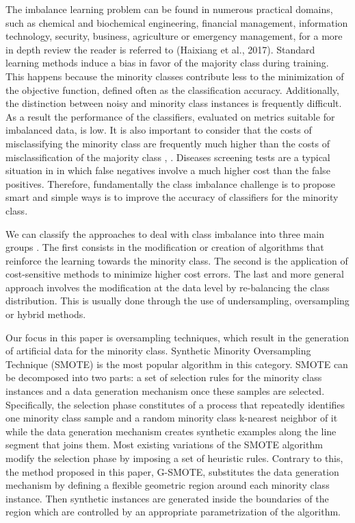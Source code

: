 \documentclass[parskip=full]{scrartcl}
\begin{document}
The imbalance learning problem can be found in numerous practical domains, such
as chemical and biochemical engineering, financial management, information
technology, security, business, agriculture or emergency management, for a more
in depth review the reader is referred to (Haixiang et al., 2017). Standard
learning methods induce a bias in favor of the majority class during training.
This happens because the minority classes contribute less to the minimization of
the objective function, defined often as the classification accuracy.
Additionally, the distinction between noisy and minority class instances is
frequently difficult. As a result the performance of the classifiers, evaluated
on metrics suitable for imbalanced data, is low. It is also important to
consider that the costs of misclassifying the minority class are frequently much
higher than the costs of misclassification of the majority class
\cite{Domingos1999}, \cite{Ting2002}. Diseases screening tests are a typical
situation in in which false negatives involve a much higher cost than the false
positives. Therefore, fundamentally the class imbalance challenge is to propose
smart and simple ways is to improve the accuracy of classifiers for the minority
class.

We can classify the approaches to deal with class imbalance into three main
groups \cite{Fernandez2013}. The first consists in the modification or creation
of algorithms that reinforce the learning towards the minority class. The second
is the application of cost-sensitive methods to minimize higher cost errors. The
last and more general approach involves the modification at the data level by
re-balancing the class distribution. This is usually done through the use of
undersampling, oversampling or hybrid methods.

Our focus in this paper is oversampling techniques, which result in the
generation of artificial data for the minority class. Synthetic Minority
Oversampling Technique (SMOTE) \cite{Chawla2002} is the most popular algorithm
in this category. SMOTE can be decomposed into two parts: a set of selection
rules for the minority class instances and a data generation mechanism once
these samples are selected. Specifically, the selection phase constitutes of a
process that repeatedly identifies one minority class sample and a random
minority class k-nearest neighbor of it while the data generation mechanism
creates synthetic examples along the line segment that joins them. Most existing
variations of the SMOTE algorithm modify the selection phase by imposing a set
of heuristic rules. Contrary to this, the method proposed in this paper,
G-SMOTE, substitutes the data generation mechanism by defining a flexible
geometric region around each minority class instance. Then synthetic instances
are generated inside the boundaries of the region which are controlled by an
appropriate parametrization of the algorithm.
\end{document}
